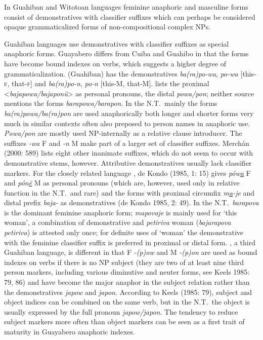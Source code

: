 \documentclass[output=collectionpaper]{langsci/langscibook}
\begin{document}
In Guahiban and Witotoan languages feminine anaphoric and masculine forms consist of demonstratives with classifier suffixes which can perhaps be considered opaque grammaticalized forms of non-compositional complex NPs.

Guahiban languages use demonstratives with classifier suffixes as special anaphoric forms. Guayabero differs from Cuiba and Guahibo in that the forms have become bound indexes on verbs, which suggests a higher degree of grammaticalization.  (Guahiban) has the demonstratives \textit{ba(ra)po-wa}, \textit{po-wa} [this-\textsc{f}, that-\textsc{f}] and \textit{ba(ra)po-n}, \textit{po-n} [this-M, that-M]. \citet[237]{Machal2000} lists the proximal <\textit{bajapowa/bajaponü}> as personal pronouns, \citet[589]{Merchan2000} the distal \textit{powa/pon}; neither source mentions the forms \textit{barapowa/barapon}.
In the N.T.\ mainly the forms \textit{ba(ra)powa/ba(ra)pon} are used anaphorically \textendash{} both longer and shorter forms very much in similar contexts \textendash{} often also preposed to person names in anaphoric use. \textit{Powa/pon} are mostly used NP-internally as a relative clause introducer. The suffixes \textit{-wa} F and \textit{-n} M make part of a larger set of classifier suffixes. Merchán (2000: 589) lists eight other inanimate suffixes, which do not seem to occur with demonstrative stems, however. Attributive demonstratives usually lack classifier markers. For the closely related language , de Kondo (1985, 1: 15) gives \textit{pów\underline{a}}
F and \textit{pón\underline{ë}} M as personal pronouns (which are, however, used only in relative function in the N.T.\ and rare) and the forms with proximal circumfix \textit{m\underline{a}-je} and distal prefix \textit{baja-} as demonstratives (de Kondo 1985, 2: 49). In the N.T.\ \textit{barapova} is the dominant feminine anaphoric form; \textit{mapovaje} is mainly used for ‘this woman’, a combination of demonstrative and \textit{petiriva} woman (\textit{bajarapova petiriva}) is attested only once; for definite uses of ‘woman’ the demonstrative with the feminine classifier suffix is preferred in proximal or distal form. , a third Guahiban language, is different in that F \textit{-(p)ow} and M \textit{-(p)on} are used as bound indexes on verbs if there is no NP subject (they are two of at least nine third person markers, including various diminutive and neuter forms, see Keels 1985: 79, 86) and have become the major anaphor in the subject relation rather than the demonstratives \textit{japow} and \textit{japon}. According to Keels (1985: 79), subject and object indices can be combined on the same verb, but in the N.T.\ the object is usually expressed by the full pronoun \textit{japow/japon}. The tendency to reduce subject markers more often than object markers can be seen as a first trait of maturity in Guayabero anaphoric indexes.
\end{document}
